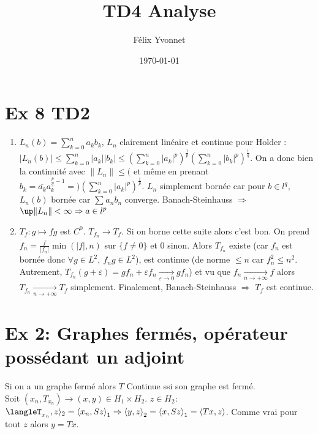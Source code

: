 \documentclass[a4paper]{article}
\title{TD4 Analyse}
\author{Félix Yvonnet}
\date{\today}
\begin{document}
\maketitle

\section*{Ex 8 TD2}
\begin{enumerate}
    \item $L_n(b)=\sum\limits_{k=0}^{n} a_kb_k$, $L_n$ clairement linéaire et continue pour Holder : $|L_n(b)|\le \sum\limits_{k=0}^{n} |a_k| |b_k|\le \left( \sum\limits_{k=0}^{n} |a_k|^p \right) ^{\frac{1}{p}}\left( \sum\limits_{k=0}^{n} |b_k|^p \right) ^{\frac{1}{q}}$. On a donc bien la continuité avec $\|L_n\|\le ($ et même en prenant $b_k=\overline{a_k}a_k^{\frac{p}{q}-1} =) \left( \sum\limits_{k=0}^{n} |a_k|^p \right) ^{\frac{1}{p}}$. $L_n$ simplement bornée car pour $b\in l^q$, $L_n(b)$ bornée car $\sum\limits_{}^{} a_nb_n$ converge. Banach-Steinhauss $\Rightarrow $ $\up \|L_n\|<\infty \Rightarrow a\in l^p$
    \item $T_f:g\mapsto fg$ est $C^0$. $T_{f_n}\underset{}{\longrightarrow} T_f$. Si on borne cette suite alors c'est bon. On prend $f_n=\frac{f}{|f_n|}\min(|f|,n)$ sur $\{f\neq 0\} $ et 0 sinon. Alors $T_{f_n}$ existe (car $f_n$ est bornée donc $\forall g\in L^2,\ f_ng\in L^2$), est continue (de norme $\le n$ car $f_n^2\le n^2$. Autrement, $T_{f_n}(g+\varepsilon )=gf_n+\varepsilon f_n \underset{\varepsilon \to 0}{\longrightarrow} gf_n$) et vu que $f_n \underset{n\to +\infty}{\longrightarrow} f$ alors $T_{f_n} \underset{n\to +\infty}{\longrightarrow} T_f$ simplement. Finalement, Banach-Steinhauss $\Rightarrow $ $T_f$ est continue.
\end{enumerate}

\section*{Ex 2: Graphes fermés, opérateur possédant un adjoint}
Si on a un graphe fermé alors $T$ Continue ssi son graphe est fermé. \\
Soit $(x_{n},T_{x_{n}})\to (x,y)\in H_1\times H_2.$ $z\in H_2:$ $\langleT_{x_{n}},z\rangle_2=\left<x_{n},Sz \right>_1\Rightarrow \left<y,z \right>_2=\left<x,Sz \right>_1=\left<Tx,z \right>$. Comme vrai pour tout $z$ alors $y=Tx.$
\end{document}
